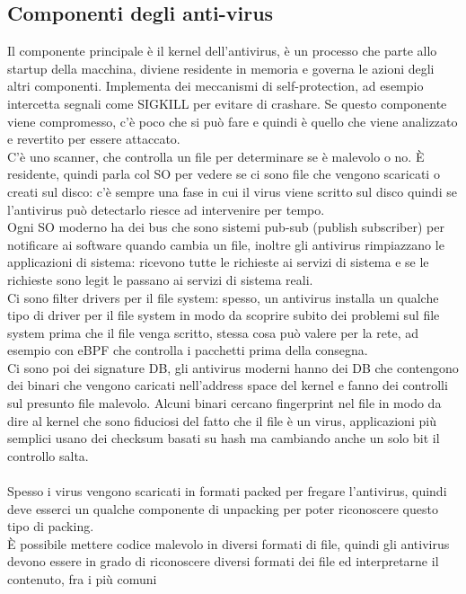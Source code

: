 \documentclass[12pt, oneside]{extbook} %
\begin{document}
\subsection{Componenti degli anti-virus}
Il componente principale è il kernel dell'antivirus, è un processo che parte allo startup della macchina, diviene residente in memoria e governa le azioni degli altri componenti. Implementa dei meccanismi di self-protection, ad esempio intercetta segnali come SIGKILL per evitare di crashare. Se questo componente viene compromesso, c'è poco che si può fare e quindi è quello che viene analizzato e revertito per essere attaccato.\\C'è uno scanner, che controlla un file per determinare se è malevolo o no. È residente, quindi parla col SO per vedere se ci sono file che vengono scaricati o creati sul disco: c'è sempre una fase in cui il virus viene scritto sul disco quindi se l'antivirus può detectarlo riesce ad intervenire per tempo.\\Ogni SO moderno ha dei bus che sono sistemi pub-sub (publish subscriber) per notificare ai software quando cambia un file, inoltre gli antivirus rimpiazzano le applicazioni di sistema: ricevono tutte le richieste ai servizi di sistema e se le richieste sono legit le passano ai servizi di sistema reali.\\Ci sono filter drivers per il file system: spesso, un antivirus installa un qualche tipo di driver per il file system in modo da scoprire subito dei problemi sul file system prima che il file venga scritto, stessa cosa può valere per la rete, ad esempio con eBPF che controlla i pacchetti prima della consegna.\\Ci sono poi dei signature DB, gli antivirus moderni hanno dei DB che contengono dei binari che vengono caricati nell'address space del kernel e fanno dei controlli sul presunto file malevolo. Alcuni binari cercano fingerprint nel file in modo da dire al kernel che sono fiduciosi del fatto che il file è un virus, applicazioni più semplici usano dei checksum basati su hash ma cambiando anche un solo bit il controllo salta.\\\\Spesso i virus vengono scaricati in formati packed per fregare l'antivirus, quindi deve esserci un qualche componente di unpacking per poter riconoscere questo tipo di packing.\\È possibile mettere codice malevolo in diversi formati di file, quindi gli antivirus devono essere in grado di riconoscere diversi formati dei file ed interpretarne il contenuto, fra i più comuni
\end{document}
